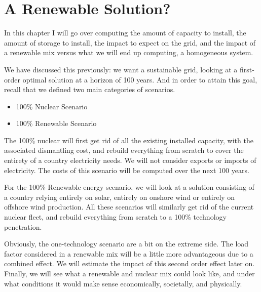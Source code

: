 \setchapterpreamble[u]{\margintoc}
\chapter{A Renewable Solution?}

In this chapter I will go over computing the amount of capacity to install, the amount of storage to install, the impact to expect on the grid, and the impact of a renewable mix versus what we will end up computing, a homogeneous system.

We have discussed this previously: we want a sustainable grid, looking at a first-order optimal solution at a horizon of 100 years. And in order to attain this goal, recall that we defined two main categories of scenarios.

\begin{itemize}
	\item 100\% Nuclear Scenario
	\item 100\% Renewable Scenario
\end{itemize}

The 100\% nuclear will first get rid of all the existing installed capacity, with the associated dismantling cost, and rebuild everything from scratch to cover the entirety of a country electricity needs. We will not consider exports or imports of electricity. The costs of this scenario will be computed over the next 100 years.

For the 100\% Renewable energy scenario, we will look at a solution consisting of a country relying entirely on solar, entirely on onshore wind or entirely on offshore wind production. All these scenarios will similarly get rid of the current nuclear fleet, and rebuild everything from scratch to a 100\% technology penetration.

Obviously, the one-technology scenario are a bit on the extreme side. The load factor considered in a renewable mix will be a little more advantageous due to a combined effect. We will estimate the impact of this second order effect later on. Finally, we will see what a renewable and nuclear mix could look like, and under what conditions it would make sense economically, societally, and physically.

